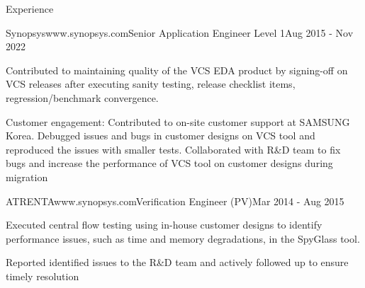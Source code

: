 \documentclass[
11pt, %
]{./assets/resume} %
\begin{document}
\begin{rSection}{Experience}
\begin{rSubsectionX}{Synopsys}{www.synopsys.com}{Senior Application Engineer Level 1}{Aug 2015 - Nov 2022}
		\item Contributed to maintaining quality of the VCS EDA product by signing-off on VCS releases after executing sanity testing, release checklist items, regression/benchmark convergence.
		\item Customer engagement: Contributed to on-site customer support at SAMSUNG Korea. Debugged issues and bugs in customer designs on VCS tool and reproduced the issues with smaller tests. Collaborated with R\&D team to fix bugs and increase the performance of VCS tool on customer designs during migration
	\end{rSubsectionX}
	\begin{rSubsectionX}{ATRENTA}{www.synopsys.com}{Verification Engineer (PV)}{Mar 2014 - Aug 2015}
		\item Executed central flow testing using in-house customer designs to identify performance issues, such as time and memory degradations, in the SpyGlass tool.
		\item Reported identified issues to the R\&D team and actively followed up to ensure timely resolution
	\end{rSubsectionX}
	
\end{rSection}


	
\end{document}
